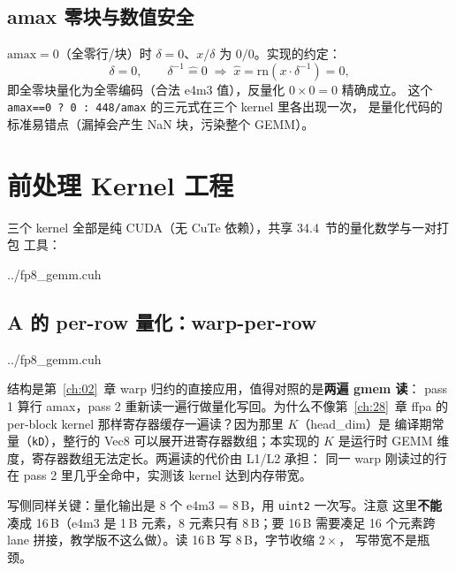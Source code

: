 \subsection{amax 零块与数值安全}

$\mathrm{amax}=0$（全零行/块）时 $\delta=0$、$x/\delta$ 为 $0/0$。实现的约定：
\begin{equation}
  \delta = 0,\qquad \delta^{-1} \mathrel{\hat=} 0
  \;\Longrightarrow\; \hat{x} = \mathrm{rn}(x\cdot\delta^{-1}) = 0,
\end{equation}
即全零块量化为全零编码（合法 e4m3 值），反量化 $0\times 0 = 0$ 精确成立。
这个 \texttt{amax==0 ? 0 : 448/amax} 的三元式在三个 kernel 里各出现一次，
是量化代码的标准易错点（漏掉会产生 NaN 块，污染整个 GEMM）。

\section{前处理 Kernel 工程}\label{sec:34-kernels}

三个 kernel 全部是纯 CUDA（无 CuTe 依赖），共享 34.4~节的量化数学与一对打包
工具：

\begin{lstinputlisting}[linerange={50-82},firstnumber=auto,
  title={fp8\_gemm.cuh L50-82（量化常数、粒度枚举、Vec8 与 e4m3x2 打包）}]{../fp8_gemm.cuh}
\end{lstinputlisting}

\subsection{A 的 per-row 量化：warp-per-row}

\begin{lstinputlisting}[linerange={91-128},firstnumber=auto,
  title={fp8\_gemm.cuh L91-128（quantize\_a\_perrow\_kernel：warp 归约 + 两遍 gmem）}]{../fp8_gemm.cuh}
\end{lstinputlisting}

结构是第~\ref{ch:02}~章 warp 归约的直接应用，值得对照的是\textbf{两遍 gmem 读}：
pass 1 算行 amax，pass 2 重新读一遍行做量化写回。为什么不像第~\ref{ch:28}~章
ffpa 的 per-block kernel 那样寄存器缓存一遍读？因为那里 $K$（head\_dim）是
编译期常量（\texttt{kD}），整行的 Vec8 可以展开进寄存器数组；本实现的
$K$ 是运行时 GEMM 维度，寄存器数组无法定长。两遍读的代价由 L1/L2 承担：
同一 warp 刚读过的行在 pass 2 里几乎全命中，实测该 kernel 达到内存带宽。

写侧同样关键：量化输出是 8 个 e4m3 = 8\,B，用 \texttt{uint2} 一次写。注意
这里\textbf{不能}凑成 16\,B（e4m3 是 1\,B 元素，8 元素只有 8\,B；要 16\,B 需要凑足
16 个元素跨 lane 拼接，教学版不这么做）。读 16\,B 写 8\,B，字节收缩 $2\times$，
写带宽不是瓶颈。

